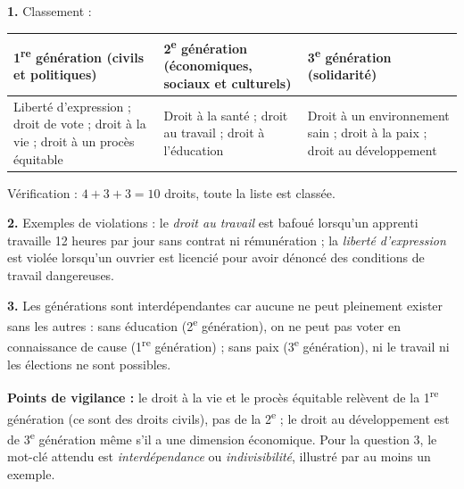 \documentclass[11pt]{article}
\begin{document}
\begin{corrige}
\textbf{1.} Classement :

\begin{center}
\begin{tabularx}{\linewidth}{|X|X|X|}
\hline
\rowcolor{popblueL} \textbf{1\textsuperscript{re} génération (civils et politiques)} & \textbf{2\textsuperscript{e} génération (économiques, sociaux et culturels)} & \textbf{3\textsuperscript{e} génération (solidarité)} \\
\hline
Liberté d'expression ; droit de vote ; droit à la vie ; droit à un procès équitable & Droit à la santé ; droit au travail ; droit à l'éducation & Droit à un environnement sain ; droit à la paix ; droit au développement \\
\hline
\end{tabularx}
\end{center}

Vérification : $4 + 3 + 3 = 10$ droits, toute la liste est classée.

\textbf{2.} Exemples de violations : le \emph{droit au travail} est bafoué lorsqu'un apprenti travaille 12 heures par jour sans contrat ni rémunération ; la \emph{liberté d'expression} est violée lorsqu'un ouvrier est licencié pour avoir dénoncé des conditions de travail dangereuses.

\textbf{3.} Les générations sont interdépendantes car aucune ne peut pleinement exister sans les autres : sans éducation (2\textsuperscript{e} génération), on ne peut pas voter en connaissance de cause (1\textsuperscript{re} génération) ; sans paix (3\textsuperscript{e} génération), ni le travail ni les élections ne sont possibles.

\textbf{Points de vigilance :} le droit à la vie et le procès équitable relèvent de la 1\textsuperscript{re} génération (ce sont des droits civils), pas de la 2\textsuperscript{e} ; le droit au développement est de 3\textsuperscript{e} génération même s'il a une dimension économique. Pour la question 3, le mot-clé attendu est \emph{interdépendance} ou \emph{indivisibilité}, illustré par au moins un exemple.
\end{corrige}
\end{document}
